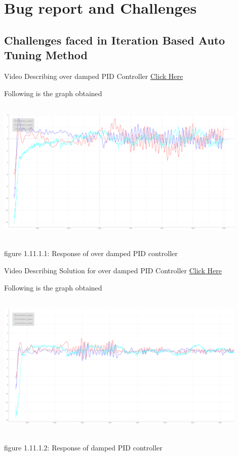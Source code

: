 \documentclass[a4paper,12pt,oneside]{book}
\begin{document}
\pagebreak
\section{Bug report and Challenges}

\subsection{Challenges faced in Iteration Based Auto Tuning Method}
\hspace{0.5cm}Video Describing over damped PID Controller
\href{https://youtu.be/r5Gr7pc5F2s}{Click Here}


Following is the graph obtained

\includegraphics[width = 12cm , height= 7cm]{Overdamped.png}
\begin{center}
    figure 1.11.1.1: Response of over damped PID controller
\end{center}


Video Describing Solution for over damped PID Controller
\href{https://youtu.be/FB5wPt4SCgo}{Click Here}

Following is the graph obtained


\includegraphics[width = 12cm , height= 7cm]{Overdamped_Solved.png}
\begin{center}
    figure 1.11.1.2: Response of damped PID controller
\end{center}
\end{document}

